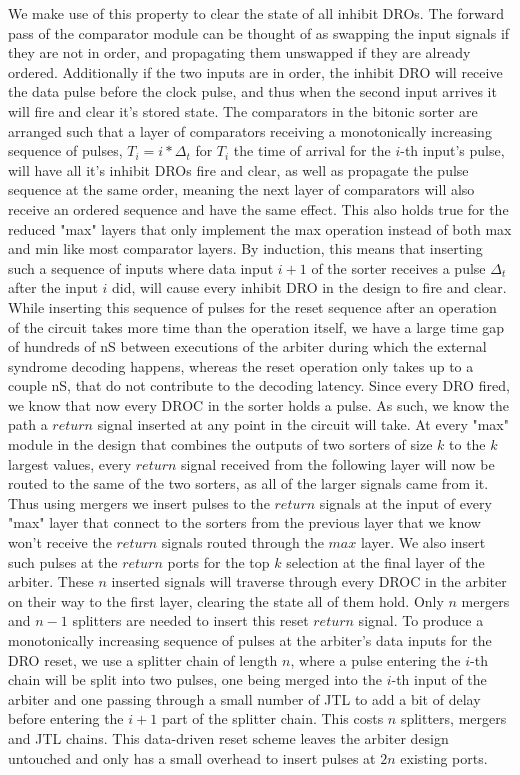 \documentclass{article}
\begin{document}
We make use of this property to clear the state of all inhibit DROs.
The forward pass of the comparator module can be thought of as swapping the input signals if they are not in order, and propagating them unswapped if they are already ordered.
Additionally if the two inputs are in order, the inhibit DRO will receive the data pulse before the clock pulse, and thus when the second input arrives it will fire and clear it's stored state.
The comparators in the bitonic sorter are arranged such that a layer of comparators receiving a monotonically increasing sequence of pulses, $T_i = i * {\Delta}_t$ for $T_i$ the time of arrival for the $i$-th input's pulse, will have all it's inhibit DROs fire and clear, as well as propagate the pulse sequence at the same order, meaning the next layer of comparators will also receive an ordered sequence and have the same effect.
This also holds true for the reduced "max" layers that only implement the max operation instead of both max and min like most comparator layers.
By induction, this means that inserting such a sequence of inputs where data input $i+1$ of the sorter receives a pulse ${\Delta}_t$ after the input $i$ did, will cause every inhibit DRO in the design to fire and clear.
While inserting this sequence of pulses for the reset sequence after an operation of the circuit takes more time than the operation itself, we have a large time gap of hundreds of nS between executions of the arbiter during which the external syndrome decoding happens, whereas the reset operation only takes up to a couple nS, that do not contribute to the decoding latency.
Since every DRO fired, we know that now every DROC in the sorter holds a pulse.
As such, we know the path a $return$ signal inserted at any point in the circuit will take.
At every "max" module in the design that combines the outputs of two sorters of size $k$ to the $k$ largest values, every $return$ signal received from the following layer will now be routed to the same of the two sorters, as all of the larger signals came from it.
Thus using mergers we insert pulses to the $return$ signals at the input of every "max" layer that connect to the sorters from the previous layer that we know won't receive the $return$ signals routed through the $max$ layer.
We also insert such pulses at the $return$ ports for the top $k$ selection at the final layer of the arbiter.
These $n$ inserted signals will traverse through every DROC in the arbiter on their way to the first layer, clearing the state all of them hold.
Only $n$ mergers and $n-1$ splitters are needed to insert this reset $return$ signal.
To produce a monotonically increasing sequence of pulses at the arbiter's data inputs for the DRO reset, we use a splitter chain of length $n$, where a pulse entering the $i$-th chain will be split into two pulses, one being merged into the $i$-th input of the arbiter and one passing through a small number of JTL to add a bit of delay before entering the $i+1$ part of the splitter chain.
This costs $n$ splitters, mergers and JTL chains.
This data-driven reset scheme leaves the arbiter design untouched and only has a small overhead to insert pulses at $2n$ existing ports.
\end{document}
